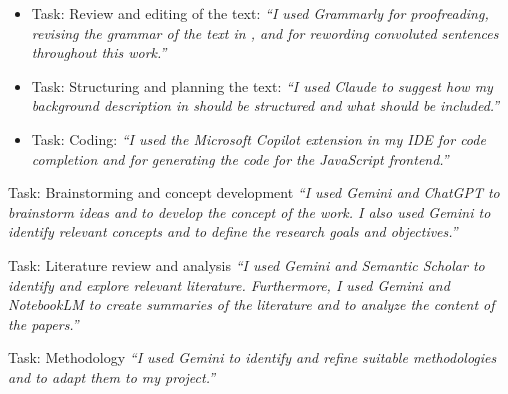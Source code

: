 \documentclass[11pt]{article}
\begin{document}
\begin{itemize}
    \item Task: Review and editing of the text: \textit{``I used Grammarly for proofreading, revising the grammar of the text in , and for rewording convoluted sentences throughout this work.''}
    \item Task: Structuring and planning the text: \textit{``I used Claude to suggest how my background description in  should be structured and what should be included.''}
    \item Task: Coding: \textit{``I used the Microsoft Copilot extension in my IDE for code completion and for generating the code for the JavaScript frontend.''}
\end{itemize}

\vspace{.25em}

\begin{answerbox}{Task: Brainstorming and concept development}
    \textit{``I used Gemini and ChatGPT to brainstorm ideas and to develop the concept of the work. I also used Gemini to identify relevant concepts and to define the research goals and objectives.''}
\end{answerbox}

\vspace{.25em}

\begin{answerbox}{Task: Literature review and analysis}
    \textit{``I used Gemini and Semantic Scholar to identify and explore relevant literature. Furthermore, I used Gemini and NotebookLM to create summaries of the literature and to analyze the content of the papers.''}
\end{answerbox}

\vspace{.25em}

\begin{answerbox}{Task: Methodology}
    \textit{``I used Gemini to identify and refine suitable methodologies and to adapt them to my project.''}
\end{answerbox}
\end{document}
